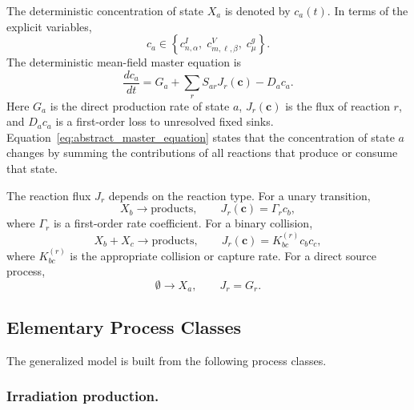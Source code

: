 The deterministic concentration of state $X_a$ is denoted by $c_a(t)$. In
terms of the explicit variables,
\begin{equation}
    c_a
    \in
    \left\{
    c^I_{n,\alpha},\;
    c^V_{m,\boldsymbol{\ell},\beta},\;
    c^g_\mu
    \right\}.
\end{equation}
The deterministic mean-field master equation is
\begin{equation}
    \boxed{
    \frac{dc_a}{dt}
    =
    G_a
    +
    \sum_r S_{ar}J_r(\mathbf{c})
    -
    D_a c_a .
    }
    \label{eq:abstract_master_equation}
\end{equation}
Here $G_a$ is the direct production rate of state $a$, $J_r(\mathbf{c})$ is
the flux of reaction $r$, and $D_a c_a$ is a first-order loss to unresolved
fixed sinks. Equation~\eqref{eq:abstract_master_equation} states that the
concentration of state $a$ changes by summing the contributions of all
reactions that produce or consume that state.

The reaction flux $J_r$ depends on the reaction type. For a unary transition,
\begin{equation}
    X_b \longrightarrow \text{products},
    \qquad
    J_r(\mathbf{c}) = \Gamma_r c_b,
    \label{eq:unary_flux}
\end{equation}
where $\Gamma_r$ is a first-order rate coefficient. For a binary collision,
\begin{equation}
    X_b+X_c \longrightarrow \text{products},
    \qquad
    J_r(\mathbf{c}) = K^{(r)}_{bc} c_b c_c,
    \label{eq:binary_flux}
\end{equation}
where $K^{(r)}_{bc}$ is the appropriate collision or capture rate. For a direct
source process,
\begin{equation}
    \emptyset \longrightarrow X_a,
    \qquad
    J_r=G_r .
    \label{eq:source_flux}
\end{equation}

\subsection{Elementary Process Classes}
\label{sec:elementary_process_classes}

The generalized model is built from the following process classes.

\subsubsection*{Irradiation production.}

